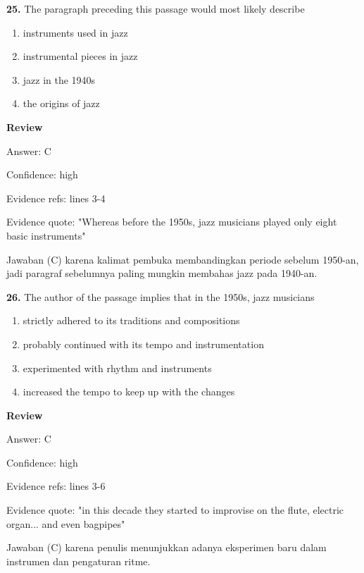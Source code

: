 \documentclass[12pt]{article}
\begin{document}
\vspace{0.25\baselineskip}
\noindent\textbf{25.} The paragraph preceding this passage would most likely describe
\begin{enumerate}[label=(\Alph*),leftmargin=*,itemsep=0.2em]
\item instruments used in jazz
\item instrumental pieces in jazz
\item jazz in the 1940s
\item the origins of jazz
\end{enumerate}
\par
\begingroup
\setlength{\parskip}{0pt}
\setlength{\parindent}{0pt}
\textbf{Review}\par
Answer: C\par
Confidence: high\par
Evidence refs: lines 3-4\par
Evidence quote: "Whereas before the 1950s, jazz musicians played only eight basic instruments"\par
Jawaban (C) karena kalimat pembuka membandingkan periode sebelum 1950-an, jadi paragraf sebelumnya paling mungkin membahas jazz pada 1940-an.\par
\endgroup
\par
\vspace{0.25\baselineskip}
\noindent\textbf{26.} The author of the passage implies that in the 1950s, jazz musicians
\begin{enumerate}[label=(\Alph*),leftmargin=*,itemsep=0.2em]
\item strictly adhered to its traditions and compositions
\item probably continued with its tempo and instrumentation
\item experimented with rhythm and instruments
\item increased the tempo to keep up with the changes
\end{enumerate}
\par
\begingroup
\setlength{\parskip}{0pt}
\setlength{\parindent}{0pt}
\textbf{Review}\par
Answer: C\par
Confidence: high\par
Evidence refs: lines 3-6\par
Evidence quote: "in this decade they started to improvise on the flute, electric organ... and even bagpipes"\par
Jawaban (C) karena penulis menunjukkan adanya eksperimen baru dalam instrumen dan pengaturan ritme.\par
\end{document}
